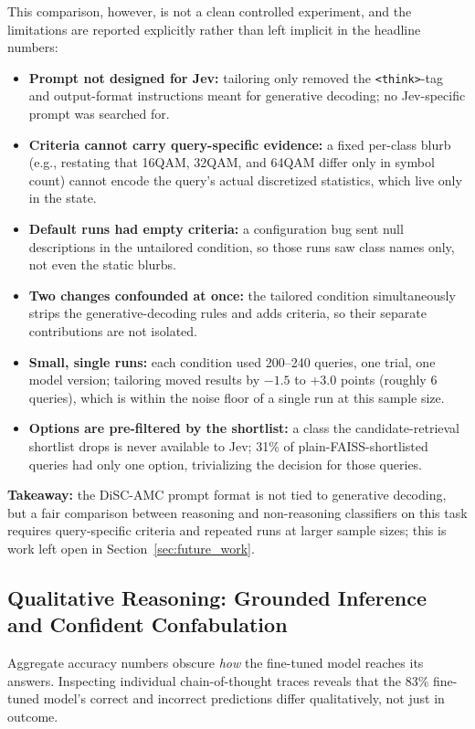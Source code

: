 This comparison, however, is not a clean controlled experiment, and the limitations are reported explicitly rather than left implicit in the headline numbers:
\begin{itemize}
    \item \textbf{Prompt not designed for Jev:} tailoring only removed the \texttt{<think>}-tag and output-format instructions meant for generative decoding; no Jev-specific prompt was searched for.
    \item \textbf{Criteria cannot carry query-specific evidence:} a fixed per-class blurb (e.g., restating that 16QAM, 32QAM, and 64QAM differ only in symbol count) cannot encode the query's actual discretized statistics, which live only in the state.
    \item \textbf{Default runs had empty criteria:} a configuration bug sent null descriptions in the untailored condition, so those runs saw class names only, not even the static blurbs.
    \item \textbf{Two changes confounded at once:} the tailored condition simultaneously strips the generative-decoding rules and adds criteria, so their separate contributions are not isolated.
    \item \textbf{Small, single runs:} each condition used 200--240 queries, one trial, one model version; tailoring moved results by $-1.5$ to $+3.0$ points (roughly 6 queries), which is within the noise floor of a single run at this sample size.
    \item \textbf{Options are pre-filtered by the shortlist:} a class the candidate-retrieval shortlist drops is never available to Jev; 31\% of plain-FAISS-shortlisted queries had only one option, trivializing the decision for those queries.
\end{itemize}

\textbf{Takeaway:} the DiSC-AMC prompt format is not tied to generative decoding, but a fair comparison between reasoning and non-reasoning classifiers on this task requires query-specific criteria and repeated runs at larger sample sizes; this is work left open in Section~\ref{sec:future_work}.

\subsection{Qualitative Reasoning: Grounded Inference and Confident Confabulation}
\label{sec:qualitative_reasoning}

Aggregate accuracy numbers obscure \emph{how} the fine-tuned model reaches its answers. Inspecting individual chain-of-thought traces reveals that the 83\% fine-tuned model's correct and incorrect predictions differ qualitatively, not just in outcome.

